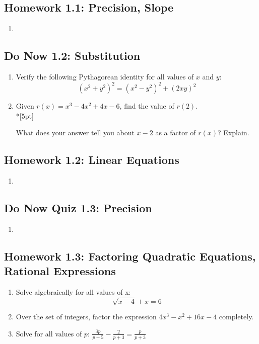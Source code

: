 \documentclass[12pt, oneside]{article}
\begin{document}
\newpage
\subsection*{Homework 1.1: Precision, Slope}
\begin{enumerate}
  \item
\end{enumerate}


\newpage
\subsection*{Do Now 1.2: Substitution}
\begin{enumerate}

  \emph{Spicy}
  \item %
  Verify the following Pythagorean identity for all values of $x$ and $y$:
  \[(x^2+y^2)^2=(x^2-y^2)^2+(2xy)^2\]

  \item %
  Given $r(x) = x^3  - 4x^2 +4x -6$, find the value of $r(2)$.\\*[5pt]

  What does your answer tell you about $x - 2$ as a factor of $r(x)$? Explain.

\end{enumerate}


\newpage
\subsection*{Homework 1.2: Linear Equations}
\begin{enumerate}
  \item
\end{enumerate}

\newpage
\subsection*{Do Now Quiz 1.3: Precision}
\begin{enumerate}
  \item
\end{enumerate}

\newpage
\subsection*{Homework 1.3: Factoring Quadratic Equations, Rational Expressions}

\begin{enumerate}
\item %
Solve algebraically for all values of x:
\[\sqrt{x-4}+x=6\]

\item %
Over the set of integers, factor the expression $4x^3 - x^2 +16x - 4$ completely.


\item %
Solve for all values of $p$:
$\displaystyle \frac{3p}{p-5}-\frac{2}{p+3}=\frac{p}{p+3}$
\end{enumerate}
\end{document}
